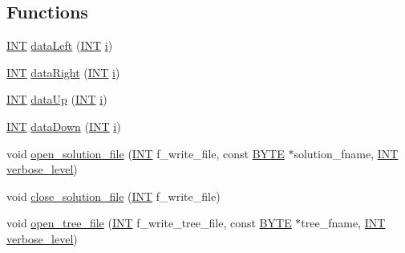 \subsection*{Functions}
\begin{DoxyCompactItemize}
\item 
\mbox{\hyperlink{galois_8h_a09fddde158a3a20bd2dcadb609de11dc}{I\+NT}} \mbox{\hyperlink{_l_i_b_2_g_a_l_o_i_s_2dlx_8_c_a8888f0dd45706c8fa1124581b18fa352}{data\+Left}} (\mbox{\hyperlink{galois_8h_a09fddde158a3a20bd2dcadb609de11dc}{I\+NT}} \mbox{\hyperlink{alphabet2_8_c_acb559820d9ca11295b4500f179ef6392}{i}})
\item 
\mbox{\hyperlink{galois_8h_a09fddde158a3a20bd2dcadb609de11dc}{I\+NT}} \mbox{\hyperlink{_l_i_b_2_g_a_l_o_i_s_2dlx_8_c_a89f3d1856c52f00a6c8147b52a39ff8b}{data\+Right}} (\mbox{\hyperlink{galois_8h_a09fddde158a3a20bd2dcadb609de11dc}{I\+NT}} \mbox{\hyperlink{alphabet2_8_c_acb559820d9ca11295b4500f179ef6392}{i}})
\item 
\mbox{\hyperlink{galois_8h_a09fddde158a3a20bd2dcadb609de11dc}{I\+NT}} \mbox{\hyperlink{_l_i_b_2_g_a_l_o_i_s_2dlx_8_c_a3b4f22e3083f708496b036d8b327cde6}{data\+Up}} (\mbox{\hyperlink{galois_8h_a09fddde158a3a20bd2dcadb609de11dc}{I\+NT}} \mbox{\hyperlink{alphabet2_8_c_acb559820d9ca11295b4500f179ef6392}{i}})
\item 
\mbox{\hyperlink{galois_8h_a09fddde158a3a20bd2dcadb609de11dc}{I\+NT}} \mbox{\hyperlink{_l_i_b_2_g_a_l_o_i_s_2dlx_8_c_a70f89cf63f3fa3b87ce334e374754482}{data\+Down}} (\mbox{\hyperlink{galois_8h_a09fddde158a3a20bd2dcadb609de11dc}{I\+NT}} \mbox{\hyperlink{alphabet2_8_c_acb559820d9ca11295b4500f179ef6392}{i}})
\item 
void \mbox{\hyperlink{_l_i_b_2_g_a_l_o_i_s_2dlx_8_c_a1ab938d1414c2ce08a91cdc5d390a6ec}{open\+\_\+solution\+\_\+file}} (\mbox{\hyperlink{galois_8h_a09fddde158a3a20bd2dcadb609de11dc}{I\+NT}} f\+\_\+write\+\_\+file, const \mbox{\hyperlink{galois_8h_ab6cc7b4aeb6ea31aba2b3fbfc83ff5e6}{B\+Y\+TE}} $\ast$solution\+\_\+fname, \mbox{\hyperlink{galois_8h_a09fddde158a3a20bd2dcadb609de11dc}{I\+NT}} \mbox{\hyperlink{simeon_8_c_a818073fbcc2f439e7c56952f67386122}{verbose\+\_\+level}})
\item 
void \mbox{\hyperlink{_l_i_b_2_g_a_l_o_i_s_2dlx_8_c_afa8a206659c5a8f58feb9dbea3b33677}{close\+\_\+solution\+\_\+file}} (\mbox{\hyperlink{galois_8h_a09fddde158a3a20bd2dcadb609de11dc}{I\+NT}} f\+\_\+write\+\_\+file)
\item 
void \mbox{\hyperlink{_l_i_b_2_g_a_l_o_i_s_2dlx_8_c_a326744a7570a6f5993c62aae87647cbf}{open\+\_\+tree\+\_\+file}} (\mbox{\hyperlink{galois_8h_a09fddde158a3a20bd2dcadb609de11dc}{I\+NT}} f\+\_\+write\+\_\+tree\+\_\+file, const \mbox{\hyperlink{galois_8h_ab6cc7b4aeb6ea31aba2b3fbfc83ff5e6}{B\+Y\+TE}} $\ast$tree\+\_\+fname, \mbox{\hyperlink{galois_8h_a09fddde158a3a20bd2dcadb609de11dc}{I\+NT}} \mbox{\hyperlink{simeon_8_c_a818073fbcc2f439e7c56952f67386122}{verbose\+\_\+level}})

\end{DoxyCompactItemize}
